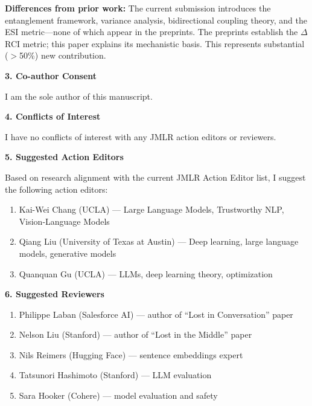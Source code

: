 \documentclass[11pt]{article}
\begin{document}
\textbf{Differences from prior work:} The current submission introduces the entanglement framework, variance analysis, bidirectional coupling theory, and the ESI metric---none of which appear in the preprints. The preprints establish the $\Delta$RCI metric; this paper explains its mechanistic basis. This represents substantial ($>$50\%) new contribution.

\vspace{1em}

\noindent \textbf{3. Co-author Consent}

I am the sole author of this manuscript.

\vspace{1em}

\noindent \textbf{4. Conflicts of Interest}

I have no conflicts of interest with any JMLR action editors or reviewers.

\vspace{1em}

\noindent \textbf{5. Suggested Action Editors}

Based on research alignment with the current JMLR Action Editor list, I suggest the following action editors:
\begin{enumerate}
    \item Kai-Wei Chang (UCLA) --- Large Language Models, Trustworthy NLP, Vision-Language Models
    \item Qiang Liu (University of Texas at Austin) --- Deep learning, large language models, generative models
    \item Quanquan Gu (UCLA) --- LLMs, deep learning theory, optimization
\end{enumerate}

\vspace{1em}

\noindent \textbf{6. Suggested Reviewers}

\begin{enumerate}
    \item Philippe Laban (Salesforce AI) --- author of ``Lost in Conversation'' paper
    \item Nelson Liu (Stanford) --- author of ``Lost in the Middle'' paper
    \item Nils Reimers (Hugging Face) --- sentence embeddings expert
    \item Tatsunori Hashimoto (Stanford) --- LLM evaluation
    \item Sara Hooker (Cohere) --- model evaluation and safety
\end{enumerate}
\end{document}
